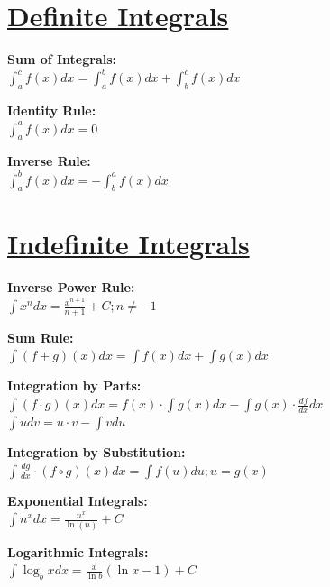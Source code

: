 \documentclass[12pt]{article}
\begin{document}
\section*{\underline{\textbf{Definite Integrals}}}
\begin{minipage}{\textwidth}
    \textbf{Sum of Integrals:}
    \\ \( \displaystyle\int_{a}^{c} {f(x) dx} = \displaystyle\int_{a}^{b} {f(x) dx} + \displaystyle\int_{b}^{c} {f(x) dx} \)
\end{minipage}
\begin{minipage}{\textwidth}
    \textbf{Identity Rule:}
    \\ \( \displaystyle\int_{a}^{a} {f(x) dx} = 0 \)
\end{minipage}
\begin{minipage}{\textwidth}
    \textbf{Inverse Rule:}
    \\ \( \displaystyle\int_{a}^{b} {f(x) dx} = - \displaystyle\int_{b}^{a} {f(x) dx} \)
\end{minipage}



\section*{\underline{\textbf{Indefinite Integrals}}}
\begin{minipage}{\textwidth}
    \textbf{Inverse Power Rule:}
    \\ \( \displaystyle\int {x^n dx} = \displaystyle\frac{ x^{n + 1} }{ n + 1 } + C ; n \ne -1 \)
\end{minipage}
\begin{minipage}{\textwidth}
    \textbf{Sum Rule:}
    \\ \( \displaystyle\int {(f + g)(x) dx} = \displaystyle\int {f(x) dx} + \displaystyle\int {g(x) dx} \)
\end{minipage}
\begin{minipage}{\textwidth}
    \textbf{Integration by Parts:}
    \\ \( \displaystyle\int {(f \cdot g)(x) dx} = f(x) \cdot \displaystyle\int {g(x) dx} - \int {g(x) \cdot \frac{ df }{ dx } dx} \)
    \\ \( \displaystyle\int {u dv} = u \cdot v - \displaystyle\int {v du} \)
\end{minipage}
\begin{minipage}{\textwidth}
    \textbf{Integration by Substitution:}
    \\ \( \displaystyle\int {\displaystyle\frac{ dg }{ dx } \cdot (f \circ g)(x) dx} = \displaystyle\int {f(u) du} ; u = g(x) \)
\end{minipage}
\begin{minipage}{\textwidth}
    \textbf{Exponential Integrals:}
    \\ \( \displaystyle\int {n^x dx} = \displaystyle\frac{ n^x }{ \ln(n) } + C \)
\end{minipage}
\begin{minipage}{\textwidth}
    \textbf{Logarithmic Integrals:}
    \\ \( \displaystyle\int {\log_b{x} dx} = \displaystyle\frac{ x }{ \ln b } (\ln x - 1) + C \)
\end{minipage}
\end{document}
